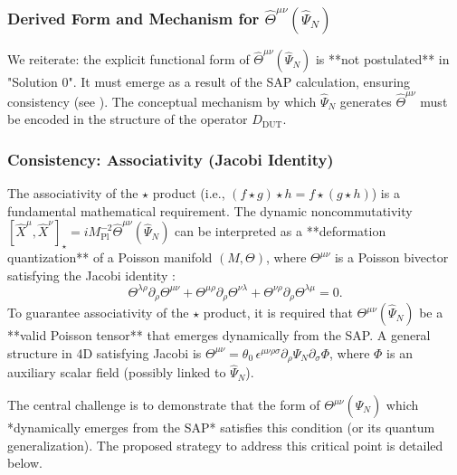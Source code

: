 \documentclass[11pt, a4paper]{article}
\theoremstyle{remark}
\newcommand{\Op}[1]{\hat{#1}}
\newcommand{\Star}{\star}
\newcommand{\Mpl}{M_{\mathrm{Pl}}}
\begin{document}
\subsubsection{Derived Form and Mechanism for \texorpdfstring{$\Op{\Theta}^{\mu\nu}(\Op{\Psi}_N)$}{Theta(PsiN)}}
\label{ssubsec:dynamic_theta_derived_final}
We reiterate: the explicit functional form of \( \Op{\Theta}^{\mu\nu}(\Op{\Psi}_N) \) is **not postulated** in "Solution 0". It must emerge as a result of the SAP calculation, ensuring consistency (see ). The conceptual mechanism by which \( \Op{\Psi}_N \) generates \( \Op{\Theta}^{\mu\nu} \) must be encoded in the structure of the operator \( D_{\text{DUT}} \).

\subsubsection{Consistency: Associativity (Jacobi Identity)}
\label{ssubsec:associativity_final}

The associativity of the \( \Star \) product (i.e., \( (f \star g) \star h = f \star (g \star h) \)) is a fundamental mathematical requirement. The dynamic noncommutativity \( [\hat{X}^\mu, \hat{X}^\nu]_\star = i\Mpl^{-2} \Op{\Theta}^{\mu\nu}(\Op{\Psi}_N) \) can be interpreted as a **deformation quantization** of a Poisson manifold \( (M, \Theta) \), where \( \Theta^{\mu\nu} \) is a Poisson bivector satisfying the Jacobi identity \citep{Kontsevich2003Deformation, Vaisman1994Poisson}:
\begin{equation} \label{eq:poisson_condition_final}
\Theta^{\lambda\rho} \partial_\rho \Theta^{\mu\nu} + \Theta^{\mu\rho} \partial_\rho \Theta^{\nu\lambda} + \Theta^{\nu\rho} \partial_\rho \Theta^{\lambda\mu} = 0.
\end{equation}
To guarantee associativity of the \(\star\) product, it is required that \( \Theta^{\mu\nu}(\Op{\Psi}_N) \) be a **valid Poisson tensor** that emerges dynamically from the SAP. A general structure in 4D satisfying Jacobi is \( \Theta^{\mu\nu} = \theta_0 \, \epsilon^{\mu\nu\rho\sigma} \partial_\rho \Psi_N \partial_\sigma \Phi \), where \( \Phi \) is an auxiliary scalar field (possibly linked to \( \Op{\Psi}_N \)).

The central challenge is to demonstrate that the form of \( \Theta^{\mu\nu}(\Op{\Psi}_N) \) which *dynamically emerges from the SAP* satisfies this condition (or its quantum generalization). The proposed strategy to address this critical point is detailed below.
\end{document}
